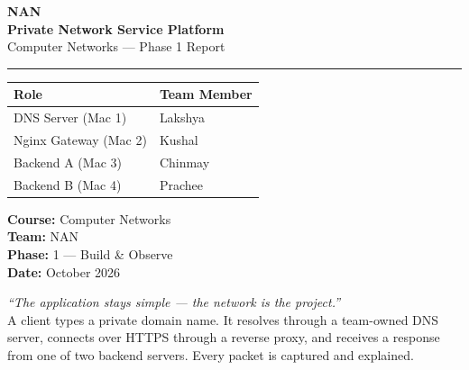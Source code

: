 \documentclass[12pt,a4paper]{article}
\begin{document}
\begin{titlepage}
  \centering
  \vspace*{1.5cm}

  {\Huge\bfseries\color{nanblue} NAN}\\[0.4cm]
  {\Large\bfseries\color{nangray} Private Network Service Platform}\\[0.2cm]
  {\large Computer Networks --- Phase 1 Report}

  \vspace{1cm}
  \textcolor{nanblue}{\rule{0.6\linewidth}{1.5pt}}
  \vspace{1cm}

  \begin{center}
    \begin{tabular}{ll}
      \toprule
      \textbf{Role} & \textbf{Team Member} \\
      \midrule
      DNS Server (Mac 1) & Lakshya \\
      Nginx Gateway (Mac 2) & Kushal \\
      Backend A (Mac 3) & Chinmay \\
      Backend B (Mac 4) & Prachee \\
      \bottomrule
    \end{tabular}
  \end{center}

  \vspace{1.2cm}
  {\large\textbf{Course:} Computer Networks}\\[0.2cm]
  {\large\textbf{Team:} NAN}\\[0.2cm]
  {\large\textbf{Phase:} 1 --- Build \& Observe}\\[0.2cm]
  {\large\textbf{Date:} October 2026}

  \vfill

  \begin{infobox}
    \textit{``The application stays simple --- the network is the project.''}\\[0.3em]
    A client types a private domain name. It resolves through a team-owned DNS server,
    connects over HTTPS through a reverse proxy, and receives a response from one of
    two backend servers. Every packet is captured and explained.
  \end{infobox}

\end{titlepage}

\tableofcontents
\newpage
\end{document}
